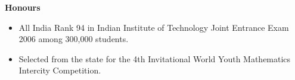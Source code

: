 \documentclass[letterpaper,11pt]{article}
\makeatletter
\newcommand{\resitem}[1]{\item[\ding{226}] #1 \vspace{-2pt}}
\newcommand{\resheading}[1]{{\large \colorbox{mygrey}{\begin{minipage}{\textwidth}{\textbf{#1 \vphantom{p\^{E}}}}\end{minipage}}}}
\newcommand{\ressubheading}[4]{
\begin{tabular*}{7.0in}{l@{\extracolsep{\fill}}r}
		\textbf{#1} & #2 \\
		\textit{#3} & \textit{#4} \\
\end{tabular*}\vspace{-6pt}}
\makeatother
\begin{document}
\resheading{Honours}
\begin{itemize}

\item{All India Rank 94 in Indian Institute of Technology Joint Entrance Exam 2006 among 300,000 students.}
\item{Selected from the state for the 4th Invitational World Youth Mathematics Intercity Competition.}

\end{itemize}

%
%
\end{document}
